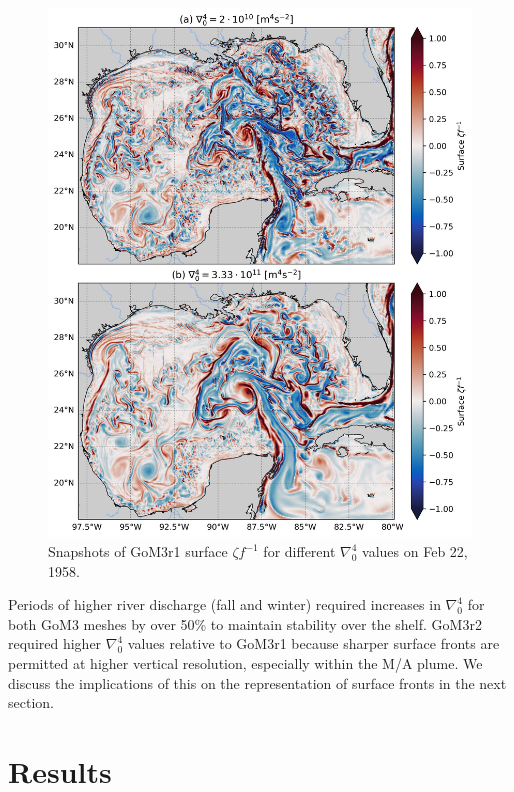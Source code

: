 \begin{figure}
\centerline{\includegraphics[width=\textwidth]{figures/scgsr/rvort_del4_comp.jpg}}
    \caption{Snapshots of GoM3r1 surface $\zeta f^{-1}$ for different $\nabla_0^4$ values on Feb 22, 1958.}
    \label{fig:del4}
\end{figure}

Periods of higher river discharge (fall and winter) required increases in $\nabla_0^4$ for both GoM3 meshes by over 50\% to maintain stability over the shelf. GoM3r2 required higher $\nabla_0^4$ values relative to GoM3r1 because sharper surface fronts are permitted at higher vertical resolution, especially within the M/A plume. We discuss the implications of this on the representation of surface fronts in the next section. 

\section{Results}
